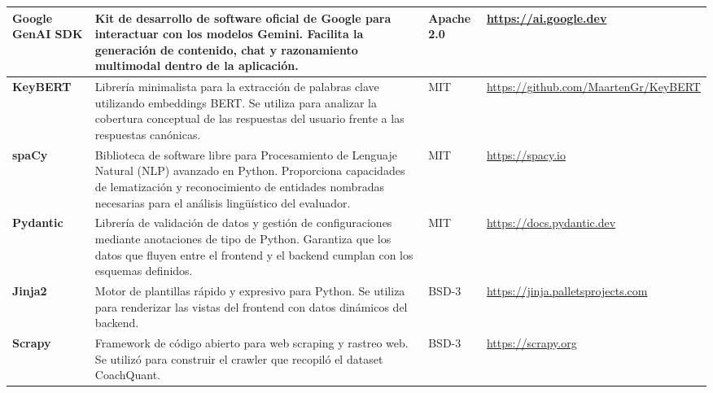 \documentclass[12pt, a4paper]{article}
\begin{document}
\begin{longtable}{|p{3cm}|p{8.5cm}|p{1.5cm}|p{2.5cm}|}
\hline
\textbf{Google GenAI SDK} & Kit de desarrollo de software oficial de Google para interactuar con los modelos Gemini. Facilita la generación de contenido, chat y razonamiento multimodal dentro de la aplicación. & Apache 2.0 & \url{https://ai.google.dev} \\
\hline
\textbf{KeyBERT} & Librería minimalista para la extracción de palabras clave utilizando embeddings BERT. Se utiliza para analizar la cobertura conceptual de las respuestas del usuario frente a las respuestas canónicas. & MIT & \url{https://github.com/MaartenGr/KeyBERT} \\
\hline
\textbf{spaCy} & Biblioteca de software libre para Procesamiento de Lenguaje Natural (NLP) avanzado en Python. Proporciona capacidades de lematización y reconocimiento de entidades nombradas necesarias para el análisis lingüístico del evaluador. & MIT & \url{https://spacy.io} \\
\hline
\textbf{Pydantic} & Librería de validación de datos y gestión de configuraciones mediante anotaciones de tipo de Python. Garantiza que los datos que fluyen entre el frontend y el backend cumplan con los esquemas definidos. & MIT & \url{https://docs.pydantic.dev} \\
\hline
\textbf{Jinja2} & Motor de plantillas rápido y expresivo para Python. Se utiliza para renderizar las vistas del frontend con datos dinámicos del backend. & BSD-3 & \url{https://jinja.palletsprojects.com} \\
\hline
\textbf{Scrapy} & Framework de código abierto para web scraping y rastreo web. Se utilizó para construir el crawler que recopiló el dataset CoachQuant. & BSD-3 & \url{https://scrapy.org} \\
\hline
\end{longtable}


\end{document}
